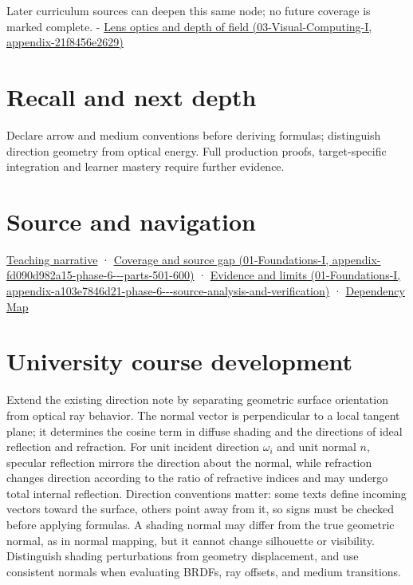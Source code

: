 Later curriculum sources can deepen this same node; no future coverage is marked complete. - \href{../03-Visual-Computing-I/main.pdf\#nameddest=appendix-21f8456e2629}{Lens optics and depth of field (03-Visual-Computing-I, appendix-21f8456e2629)}

\section{Recall and next depth}\label{appendix-44e00863b4d5-recall-and-next-depth}

Declare arrow and medium conventions before deriving formulas; distinguish direction geometry from optical energy. Full production proofs, target-specific integration and learner mastery require further evidence.

\section{Source and navigation}\label{appendix-44e00863b4d5-source-and-navigation}

\href{Continuous\%20Notes/Computing\%20Foundations\%20-\%20From\%20Bits\%20to\%20C++\%20and\%20Systems\%20APIs\#Light\%20uses\%20the\%20same\%20decomposition\%20in\%20a\%20new\%20role}{Teaching narrative} · \href{../01-Foundations-I/main.pdf\#nameddest=appendix-fd090d982a15-phase-6---parts-501-600}{Coverage and source gap (01-Foundations-I, appendix-fd090d982a15-phase-6-\/-\/-parts-501-600)} · \href{../01-Foundations-I/main.pdf\#nameddest=appendix-a103e7846d21-phase-6---source-analysis-and-verification}{Evidence and limits (01-Foundations-I, appendix-a103e7846d21-phase-6-\/-\/-source-analysis-and-verification)} · \hyperref[appendix-4ad47bdd269a]{Dependency Map}

\section{University course development}\label{appendix-44e00863b4d5-university-course-development}

Extend the existing direction note by separating geometric surface orientation from optical ray behavior. The normal vector is perpendicular to a local tangent plane; it determines the cosine term in diffuse shading and the directions of ideal reflection and refraction. For unit incident direction \(\omega_i\) and unit normal \(n\), specular reflection mirrors the direction about the normal, while refraction changes direction according to the ratio of refractive indices and may undergo total internal reflection. Direction conventions matter: some texts define incoming vectors toward the surface, others point away from it, so signs must be checked before applying formulas. A shading normal may differ from the true geometric normal, as in normal mapping, but it cannot change silhouette or visibility. Distinguish shading perturbations from geometry displacement, and use consistent normals when evaluating BRDFs, ray offsets, and medium transitions.

